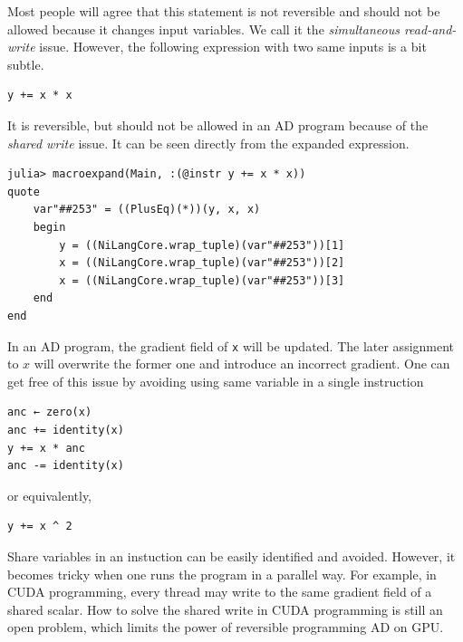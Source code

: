 \documentclass{article}
\newcommand{\<}{\langle}
\renewcommand{\>}{\rangle}
\theoremstyle{definition}\newtheorem{definition}{\textit{Definition}}
\begin{document}
Most people will agree that this statement is not reversible and should not be allowed because it changes input variables.
We call it the \textit{simultaneous read-and-write} issue.
However, the following expression with two same inputs is a bit subtle.

\begin{minipage}{.88\columnwidth}
\begin{lstlisting}
y += x * x
\end{lstlisting}
\end{minipage}

It is reversible, but should not be allowed in an AD program because of the \textit{shared write} issue.
It can be seen directly from the expanded expression.

\begin{minipage}{.88\columnwidth}
\begin{lstlisting}
julia> macroexpand(Main, :(@instr y += x * x))
quote
    var"##253" = ((PlusEq)(*))(y, x, x)
    begin
        y = ((NiLangCore.wrap_tuple)(var"##253"))[1]
        x = ((NiLangCore.wrap_tuple)(var"##253"))[2]
        x = ((NiLangCore.wrap_tuple)(var"##253"))[3]
    end
end
\end{lstlisting}
\end{minipage}

In an AD program, the gradient field of \texttt{x} will be updated.
The later assignment to $x$ will overwrite the former one and introduce an incorrect gradient.
One can get free of this issue by avoiding using same variable in a single instruction

\begin{minipage}{.88\columnwidth}
\begin{lstlisting}
anc ← zero(x)
anc += identity(x)
y += x * anc
anc -= identity(x)
\end{lstlisting}
\end{minipage}

or equivalently,

\begin{minipage}{.88\columnwidth}
\begin{lstlisting}
y += x ^ 2
\end{lstlisting}
\end{minipage}

Share variables in an instuction can be easily identified and avoided.
However, it becomes tricky when one runs the program in a parallel way.
For example, in CUDA programming, every thread may write to the same gradient field of a shared scalar.
How to solve the shared write in CUDA programming is still an open problem, which limits the power of reversible programming AD on GPU.
\end{document}
